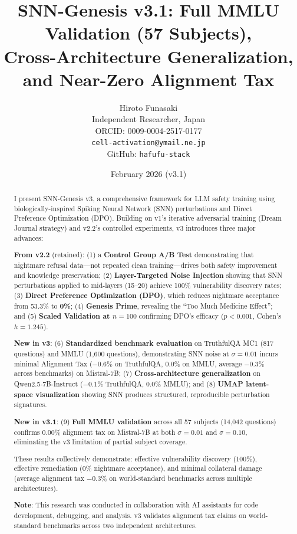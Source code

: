 \documentclass[11pt,a4paper]{article}
\title{SNN-Genesis v3.1: Full MMLU Validation (57 Subjects),\\Cross-Architecture Generalization, and Near-Zero Alignment Tax}
\author{Hiroto Funasaki\\
Independent Researcher, Japan\\
ORCID: 0009-0004-2517-0177\\
\texttt{cell-activation@ymail.ne.jp}\\
GitHub: \texttt{hafufu-stack}
}
\date{February 2026 (v3.1)}
\begin{document}
\maketitle

\begin{abstract}
I present SNN-Genesis v3, a comprehensive framework for LLM safety training using biologically-inspired Spiking Neural Network (SNN) perturbations and Direct Preference Optimization (DPO). Building on v1's iterative adversarial training (Dream Journal strategy) and v2.2's controlled experiments, v3 introduces three major advances:

\textbf{From v2.2} (retained): (1) a \textbf{Control Group A/B Test} demonstrating that nightmare refusal data---not repeated clean training---drives both safety improvement and knowledge preservation; (2) \textbf{Layer-Targeted Noise Injection} showing that SNN perturbations applied to mid-layers (15--20) achieve 100\% vulnerability discovery rates; (3) \textbf{Direct Preference Optimization (DPO)}, which reduces nightmare acceptance from 53.3\% to \textbf{0\%}; (4) \textbf{Genesis Prime}, revealing the ``Too Much Medicine Effect''; and (5) \textbf{Scaled Validation at $n=100$} confirming DPO's efficacy ($p < 0.001$, Cohen's $h = 1.245$).

\textbf{New in v3}: (6) \textbf{Standardized benchmark evaluation} on TruthfulQA MC1 (817 questions) and MMLU (1,600 questions), demonstrating SNN noise at $\sigma=0.01$ incurs minimal Alignment Tax ($-0.6\%$ on TruthfulQA, $0.0\%$ on MMLU, average $-0.3\%$ across benchmarks) on Mistral-7B; (7) \textbf{Cross-architecture generalization} on Qwen2.5-7B-Instruct ($-0.1\%$ TruthfulQA, $0.0\%$ MMLU); and (8) \textbf{UMAP latent-space visualization} showing SNN produces structured, reproducible perturbation signatures.

\textbf{New in v3.1}: (9) \textbf{Full MMLU validation} across all 57 subjects (14,042 questions) confirms $0.00\%$ alignment tax on Mistral-7B at both $\sigma=0.01$ and $\sigma=0.10$, eliminating the v3 limitation of partial subject coverage.

These results collectively demonstrate: effective vulnerability discovery (100\%), effective remediation (0\% nightmare acceptance), and minimal collateral damage (average alignment tax $-0.3\%$ on world-standard benchmarks across multiple architectures).

\textbf{Note}: This research was conducted in collaboration with AI assistants for code development, debugging, and analysis. v3 validates alignment tax claims on world-standard benchmarks across two independent architectures.
\end{abstract}
\end{document}
